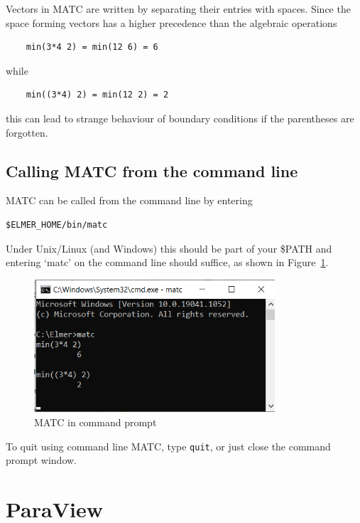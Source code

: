Vectors in MATC are written by separating their entries with spaces. Since the space forming vectors has a higher precedence than the algebraic operations

\begin{verbatim}
    min(3*4 2) = min(12 6) = 6
\end{verbatim}

\noindent while

\begin{verbatim}
    min((3*4) 2) = min(12 2) = 2
\end{verbatim}

\noindent this can lead to strange behaviour of boundary conditions if the parentheses are forgotten. 

\subsection{Calling MATC from the command line}

MATC can be called from the command line by entering \begin{verbatim}$ELMER_HOME/bin/matc\end{verbatim} Under Unix/Linux (and Windows) this should be part of your \$PATH and entering `matc' on the command line should suffice, as shown in Figure~\ref{fg:matc}.\\

\begin{figure}[H]
\centering
\includegraphics[width=0.8\textwidth]{matc}
\caption{MATC in command prompt}\label{fg:matc}
\end{figure}

\noindent To quit using command line MATC, type \texttt{quit}, or just close the command prompt window.

\newpage

\section{ParaView}

